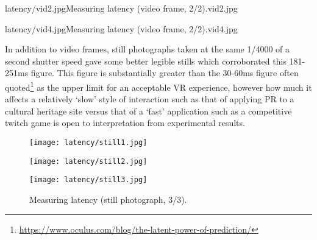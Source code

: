        {latency/vid2.jpg}{Measuring latency (video frame, 2/2).}{vid2.jpg}

       {latency/vid4.jpg}{Measuring latency (video frame, 2/2).}{vid4.jpg}

In addition to video frames, still photographs taken at the same 1/4000 of a second shutter speed gave some better legible stills which corroborated this 181-251ms figure. This figure is substantially greater than the 30-60ms figure often quoted\footnote{\url{https://www.oculus.com/blog/the-latent-power-of-prediction/}} as the upper limit for an acceptable VR experience, however how much it affects a relatively `slow' style of interaction such as that of applying PR to a cultural heritage site versus that of a `fast' application such as a competitive twitch game is open to interpretation from experimental results.

\begin{figure}[h]
    \begin{center}
    \begin{minipage}{.32\textwidth}
        \begin{center}
        \texttt{[image: latency/still1.jpg]}
        \caption{Measuring latency (still photograph, 1/3).}
        \label{still1.jpg}
        \end{center}
    \end{minipage}%
    \hspace{.01\textwidth}
    \begin{minipage}{.32\textwidth}
		\begin{center}
        \texttt{[image: latency/still2.jpg]}
        \caption{Measuring latency (still photograph, 2/3).}
        \label{still2.jpg}
        \end{center}
    \end{minipage}%
    \hspace{.01\textwidth}
    \begin{minipage}{.32\textwidth}
        \begin{center}
        \texttt{[image: latency/still3.jpg]}
        \caption{Measuring latency (still photograph, 3/3).}
        \label{still3.jpg}
        \end{center}
    \end{minipage}
    \end{center}
\end{figure}


